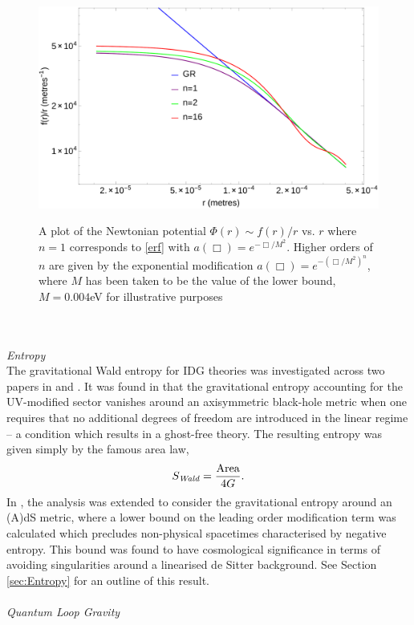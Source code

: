 \begin{figure}[h]
\centering
\includegraphics[scale=0.4]{monomialgraph.pdf}\cite{Edholm:2016hbt}
\caption{A plot of the Newtonian potential $\Phi(r)\sim f(r)/r$ vs. $r$ where $n=1$ corresponds to \eqref{erf} with $a(\Box)=e^{-\Box/M^2}$. Higher orders of $n$ are given by the exponential modification $a(\Box)=e^{-(\Box/M^2)^n}$, where $M$ has been taken to be the value of the lower bound, $M=0.004$eV for illustrative purposes} 
\end{figure}
\\\\\emph{Entropy}\\
The gravitational Wald entropy for IDG theories was investigated across two papers in \cite{Conroy:2015wfa} and \cite{Conroy:2015nva}. It was found in \cite{Conroy:2015wfa} that the gravitational entropy accounting for the UV-modified
sector vanishes around an axisymmetric black-hole metric when one requires that no additional degrees of freedom are introduced in the linear regime -- a condition which results in a ghost-free theory. The
resulting entropy was given simply by the famous area law, 
\[
S_{\text{\it Wald}}=\frac{\mbox{Area}}{4G}
.\]
In \cite{Conroy:2015nva}, the analysis was extended to consider the gravitational entropy around an (A)dS metric, where a lower bound on the leading order modification term was calculated which precludes non-physical spacetimes characterised by negative entropy. This bound was found to have cosmological significance in terms of avoiding singularities around a linearised de Sitter background. See Section \ref{sec:Entropy} for an outline of this result.
\\\\\emph{Quantum Loop Gravity}\\
